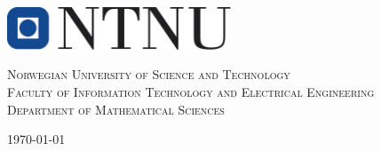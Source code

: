 \begin{titlepage}


\includegraphics[width=0.5\textwidth]{figures/ntnu-logo.png} %
 
\textsc{Norwegian University of Science and Technology}\\
\vspace{0.2cm}
\textsc{Faculty of Information Technology and Electrical Engineering}\\
\vspace{0.2cm}
\textsc{Department of Mathematical Sciences}\\
\vspace{0.2cm}


{\large \today}\\[3cm] %

\vfill %

\end{titlepage}